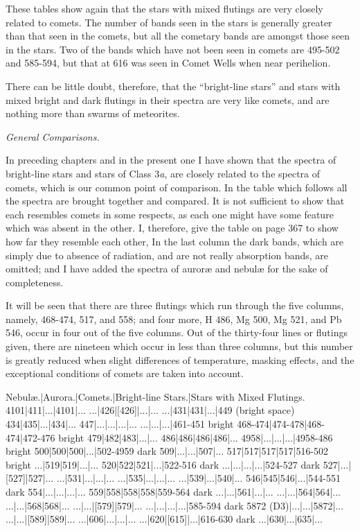 \documentclass[a4paper, 12pt, oneside, polutonikogreek, english]{article}
\begin{document}
These tables show again that the stars with mixed flutings are very closely related to comets. The number of bands seen in the stars is generally greater than that seen in the comets, but all the cometary bands are amongst those seen in the stars. Two of the bands which have not been seen in comets are 495-502 and 585-594, but that at 616 was seen in Comet Wells when near perihelion.

There can be little doubt, therefore, that the ``bright-line stars'' and stars with mixed bright and dark flutings in their spectra are very like comets, and are nothing more than swarms of meteorites.

\emph{General Comparisons.}

In preceding chapters and in the present one I have shown that the spectra of bright-line stars and stars of Class 3\emph{a}, are closely related to the spectra of comets, which is our common point of comparison. In the table which follows all the spectra are brought together and compared. It is not sufficient to show that each resembles comets in some respects, as each one might have some feature which was absent in the other. I, therefore, give the table on page 367 to show how far they resemble each other, In the last column the dark bands, which are simply due to absence of radiation, and are not really absorption bands, are omitted; and I have added the spectra of auroræ and nebulæ for the sake of completeness.

It will be seen that there are three flutings which run through the five columns, namely, 468-474, 517, and 558; and four more, H 486, Mg 500, Mg 521, and Pb 546, occur in four out of the five columns. Out of the thirty-four lines or flutings given, there are nineteen which occur in less than three columns, but this number is greatly reduced when slight differences of temperature, masking effects, and the exceptional conditions of comets are taken into account.

Nebulæ.|Aurora.|Comets.|Bright-line Stars.|Stars with Mixed Flutings. 
4101|411|...|4101|... 
...|426|[426]|...|... 
...|431|431|...|449 (bright space) 
434|435|...|434|... 
447|...|...|...|... 
...|...|...|461-451 bright 
468-474|474-478|468-474|472-476 bright 
479|482|483|...|... 
486|486|486|486|... 
4958|...|...|...|4958-486 bright 
500|500|500|...|502-4959 dark 
509|...|...|507|... 
517|517|517|517|516-502 bright 
...|519|519|...|... 
520|522|521|...|522-516 dark 
...|...|...|...|524-527 dark 
527|...|[527]|527|... 
...|531|...|...|... 
...|535|...|...|... 
...|539|...|540|... 
546|545|546|...|544-551 dark 
554|...|...|...|... 
559|558|558|558|559-564 dark 
...|...|561|...|... 
...|...|564|564|... 
...|...|568|568|... 
...|...|[579]|579|... 
...|...|...|...|585-594 dark 
5872 (D3)|...|...|5872|... 
...|...|[589]|589|... 
...|606|...|...|... 
...|620|[615]|...|616-630 dark 
...|630|...|635|... 
\end{document}
